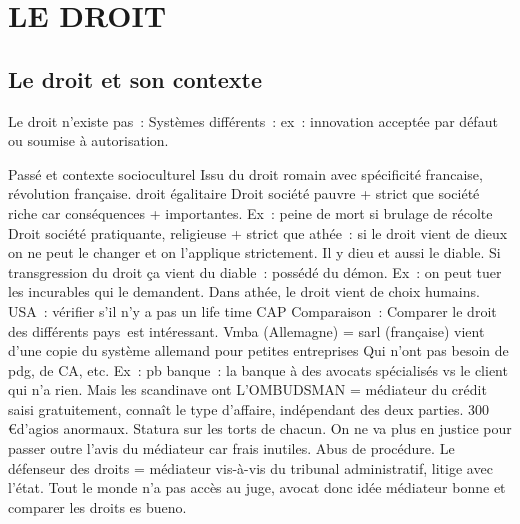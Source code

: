 \documentclass[a4paper,12pt]{article}
\date{\today}
\begin{document}
\renewcommand{\labelitemi}{\textbullet}


\pagebreak

\tableofcontents
\justify
\pagebreak



\section{LE DROIT}
\subsection{Le droit et son contexte}





Le droit n’existe pas :
Systèmes différents : ex : innovation acceptée par défaut ou soumise à autorisation. 

Passé et contexte socioculturel
Issu du droit romain avec spécificité francaise, révolution française. droit égalitaire
Droit société pauvre + strict que société riche car conséquences + importantes.
Ex : peine de mort si brulage de récolte
Droit société pratiquante, religieuse + strict que athée :  si le droit vient de dieux on ne peut le changer et on l’applique strictement. Il y dieu et aussi le diable. Si transgression du droit ça vient du diable : possédé du démon. Ex : on peut tuer les incurables qui le demandent.
Dans athée, le droit vient de choix humains.
USA : vérifier s’il n’y a pas un life time CAP
Comparaison : 
Comparer le droit des différents pays est intéressant.
Vmba (Allemagne) = sarl (française) vient d’une copie du système allemand pour petites entreprises
Qui n’ont pas besoin de pdg, de CA, etc.
Ex : pb banque : la banque à des avocats spécialisés vs le client qui n’a rien. Mais les scandinave ont
L’OMBUDSMAN = médiateur du crédit saisi gratuitement, connaît le type d’affaire, indépendant des deux parties. 300 \euro d’agios anormaux. Statura sur les torts de chacun. On ne va plus en justice pour passer outre l’avis du médiateur car frais inutiles. Abus de procédure. 
Le défenseur des droits = médiateur vis-à-vis du tribunal administratif, litige avec l’état.
Tout le monde n’a pas accès au juge, avocat donc idée médiateur bonne et comparer les droits es bueno.
\end{document}
